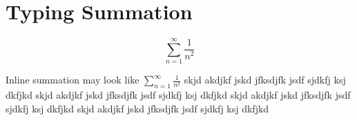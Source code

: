 \documentclass{article}
\begin{document}
	
\section{Typing Summation}

\begin{equation}
\sum_{n=1}^{\infty} \frac{1}{n^2}
\end{equation}

Inline summation may look like $\sum\limits_{n=1}^{\infty} \frac{1}{n^2}$ skjd akdjkf jskd jfksdjfk jsdf
 sjdkfj ksj dkfjkd skjd akdjkf jskd jfksdjfk jsdf
 sjdkfj ksj dkfjkd skjd akdjkf jskd jfksdjfk jsdf
 sjdkfj ksj dkfjkd skjd akdjkf jskd jfksdjfk jsdf
 sjdkfj ksj dkfjkd 
\end{document}
